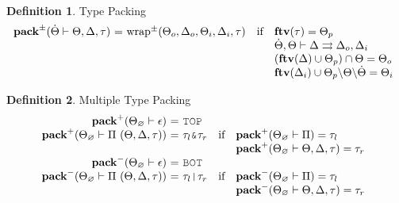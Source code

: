 \documentclass[acmsmall]{acmart}
\theoremstyle{definition}
\newtheorem{definition}{Definition}[section]
\begin{document}

\begin{definition}
  \label{def:type_packing}
  Type Packing 
  \hfill
  \small
  \\
  \[
  \begin{array}[t]{r@{}c@{}lcl}
      \textbf{pack}^\pm(\dTheta \entails \Theta, \Delta, \tau) 
      &\ =\ & 
      \text{wrap}^{\pm}(\Theta_o, \Delta_o, \Theta_i, \Delta_i, \tau)
      &\text{if}& 
      \begin{array}[t]{@{}l}
        \textbf{ftv}(\tau) = \Theta_p
        \\
        \dTheta, \Theta \entails \Delta \rightrightarrows \Delta_o, \Delta_i 
        \\
        (\textbf{ftv}(\Delta) \cup \Theta_p) \cap \Theta = \Theta_o 
        \\
        \textbf{ftv}(\Delta_i) \cup \Theta_p \backslash \Theta \backslash \dTheta = \Theta_i 
      \end{array}
  \end{array}
  \]
\end{definition}


\begin{definition}
  \label{def:multiple_type_packing}
  Multiple Type Packing 
  \hfill
  \ 
  \\
  \[
  \begin{array}[t]{r@{}c@{}lcl}
      \textbf{pack}^+(\Theta_\ignore \entails \epsilon) 
      &\ =\ & 
      \J{TOP} 

      \\

      \textbf{pack}^+(\Theta_\ignore \entails \Pi\ (\Theta, \Delta, \tau)) 
      &\ =\ & 
      \tau_l \J{\&} \tau_r
      &\text{if}& 
      \begin{array}[t]{@{}l}
        \textbf{pack}^+(\Theta_\ignore \entails \Pi) = \tau_l 
        \\
        \textbf{pack}^+(\Theta_\ignore \entails \Theta, \Delta, \tau) = \tau_r
      \end{array}

      \\

      \textbf{pack}^-(\Theta_\ignore \entails \epsilon) 
      &\ =\ & 
      \J{BOT} 

      \\

      \textbf{pack}^-(\Theta_\ignore \entails \Pi\ (\Theta, \Delta, \tau))
      &\ =\ & 
      \tau_l \J{|} \tau_r
      &\text{if}& 
      \begin{array}[t]{@{}l}
        \textbf{pack}^-(\Theta_\ignore \entails \Pi) = \tau_l
        \\
        \textbf{pack}^-(\Theta_\ignore \entails \Theta, \Delta, \tau) = \tau_r
      \end{array}
  \end{array}
  \]
\end{definition}
\end{document}
